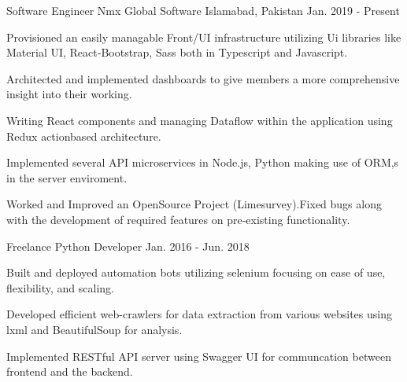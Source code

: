 

\begin{cventries}

  \cventry
    {Software Engineer} %
    {Nmx Global Software} %
    {Islamabad, Pakistan} %
    {Jan. 2019 - Present} %
    {
      \begin{cvitems} %
        \item {Provisioned an easily managable Front/UI infrastructure utilizing Ui libraries like Material UI, React‑Bootstrap, Sass both in Typescript and
        Javascript.}
        \item {Architected and implemented dashboards to give members a more comprehensive insight into their working.}
        \item {Writing React components and managing Dataflow within the application using Redux actionbased architecture.}
        \item {Implemented several API microservices in Node.js, Python making use of ORM,s in the server enviroment.}
        \item {Worked and Improved an OpenSource Project (Limesurvey).Fixed bugs along with the development of required features on pre‑existing functionality.}
      \end{cvitems}
    }

  \cventry
    {Freelance Python Developer} %
    {} %
    {} %
    {Jan. 2016 - Jun. 2018} %
    {
      \begin{cvitems} %
        \item {Built and deployed automation bots utilizing selenium focusing on ease of use, flexibility, and scaling.}
        \item {Developed efficient web-crawlers for data extraction from various websites using lxml and BeautifulSoup for analysis.}
        \item {Implemented RESTful API server using Swagger UI for communcation between frontend and the backend. }
      \end{cvitems}
    }

\end{cventries}
